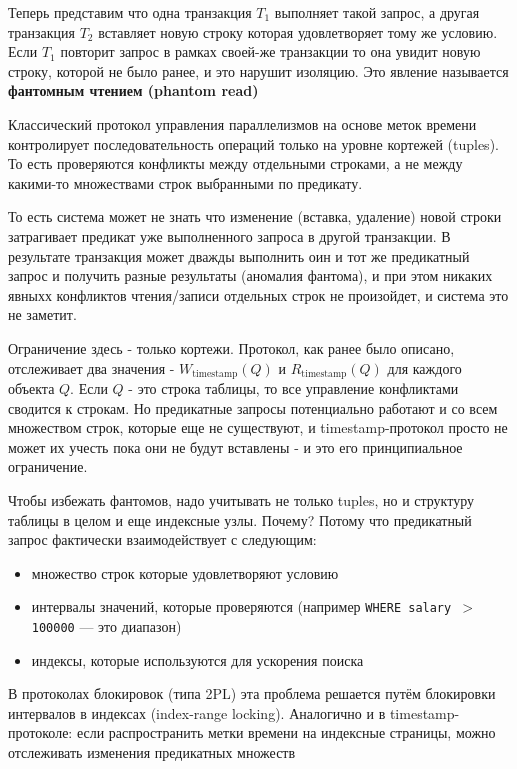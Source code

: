 Теперь представим что одна транзакция $T_1$ выполняет такой запрос, а другая транзакция $T_2$ вставляет новую строку которая удовлетворяет тому же условию. Если $T_1$ повторит запрос в рамках своей-же транзакции то она увидит новую строку, которой не было ранее, и это нарушит изоляцию. Это явление называется \textbf{фантомным чтением (phantom read)}

Классический протокол управления параллелизмов на основе меток времени контролирует последовательность операций только на уровне кортежей (tuples). То есть проверяются конфликты между отдельными строками, а не между какими-то множествами строк выбранными по предикату.

То есть система может не знать что изменение (вставка, удаление) новой строки затрагивает предикат уже выполненного запроса в другой транзакции. В результате транзакция может дважды выполнить оин и тот же предикатный запрос и получить разные результаты (аномалия фантома), и при этом никаких явныхх конфликтов чтения/записи отдельных строк не произойдет, и система это не заметит.

Ограничение здесь - только кортежи. Протокол, как ранее было описано, отслеживает два значения - $W_{\text{timestamp}}(Q)$ и $R_{\text{timestamp}}(Q)$ для каждого объекта $Q$. Если $Q$ - это строка таблицы, то все управление конфликтами сводится к строкам. Но предикатные запросы потенциально работают и со всем множеством строк, которые еще не существуют, и timestamp-протокол просто не может их учесть пока они не будут вставлены - и это его принципиальное ограничение.

Чтобы избежать фантомов, надо учитывать не только tuples, но и структуру таблицы в целом и еще индексные узлы. Почему?
Потому что предикатный запрос фактически взаимодействует с следующим:
\begin{itemize}
    \item множество строк которые удовлетворяют условию
    \item интервалы значений, которые проверяются (например \texttt{WHERE salary $>$ 100000} — это диапазон)
    \item индексы, которые используются для ускорения поиска
\end{itemize}

В протоколах блокировок (типа 2PL) эта проблема решается путём блокировки интервалов в индексах (index-range locking). Аналогично и в timestamp-протоколе: если распространить метки времени на индексные страницы, можно отслеживать изменения предикатных множеств \autocite{Silberschatz, ElmasriNavathe}

